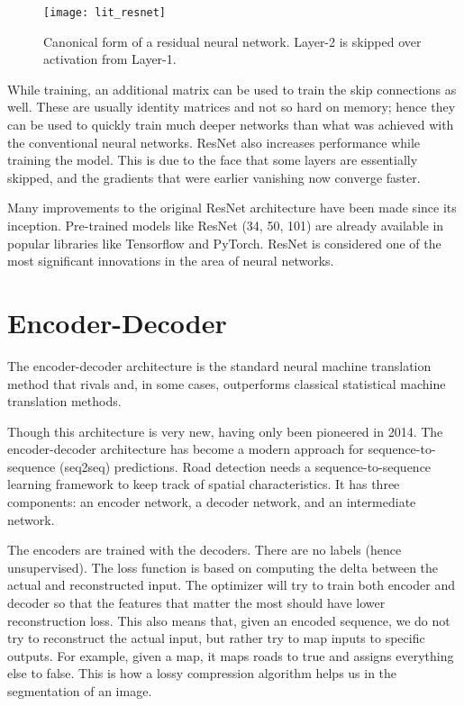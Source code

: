 \begin{figure}[h!]
    \centering
    \texttt{[image: lit\_resnet]}
    \caption[A residual network]{Canonical form of a residual neural network. Layer-2 is skipped over activation from Layer-1.}
    \label{fig:residual_network}
\end{figure}

While training, an additional matrix can be used to train the skip connections as well. These are usually identity matrices and not so hard on memory; hence they can be used to quickly train much deeper networks than what was achieved with the conventional neural networks. ResNet also increases performance while training the model. This is due to the face that some layers are essentially skipped, and the gradients that were earlier vanishing now converge faster.

Many improvements to the original ResNet architecture have been made since its inception. Pre-trained models like ResNet (34, 50, 101) are already available in popular libraries like Tensorflow and PyTorch. ResNet is considered one of the most significant innovations in the area of neural networks.

\section{Encoder-Decoder}\label{sec:encoderDecoder}
The encoder-decoder architecture is the standard neural machine translation method that rivals and, in some cases, outperforms classical statistical machine translation methods.

Though this architecture is very new, having only been pioneered in 2014. The encoder-decoder architecture has become a modern approach for sequence-to-sequence (seq2seq) predictions. Road detection needs a sequence-to-sequence learning framework to keep track of spatial characteristics. It has three components: an encoder network, a decoder network, and an intermediate network.

The encoders are trained with the decoders. There are no labels (hence unsupervised). The loss function is based on computing the delta between the actual and reconstructed input. The optimizer will try to train both encoder and decoder so that the features that matter the most should have lower reconstruction loss. This also means that, given an encoded sequence, we do not try to reconstruct the actual input, but rather try to map inputs to specific outputs. For example, given a map, it maps roads to true and assigns everything else to false. This is how a lossy compression algorithm helps us in the segmentation of an image.

